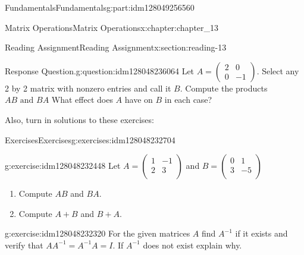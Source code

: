 \documentclass[oneside,10pt,]{book}
\numberwithin{equation}{section}
\begin{document}
\begin{partptx}{Fundamentals}{}{Fundamentals}{}{}{g:part:idm128049256560}
\begin{chapterptx}{Matrix Operations}{}{Matrix Operations}{}{}{x:chapter:chapter_13}
\begin{sectionptx}{Reading Assignment}{}{Reading Assignment}{}{}{x:section:reading-13}
\begin{question}{Response Question.}{g:question:idm128048236064}
Let \(A=\left(\begin{array}{cc} 2 & 0\\ 0 & -1 \end{array}\right)\). Select any 2 by 2 matrix with nonzero entries and call it \(B\). Compute the products \(AB \textrm{ and }BA\)  What effect does \(A\) have on \(B\) in each case?%
\end{question}
Also, turn in solutions to these exercises:%
%
%
\typeout{************************************************}
\typeout{************************************************}
%
\begin{exercises-subsection}{Exercises}{}{Exercises}{}{}{g:exercises:idm128048232704}
\par\medskip\noindent%
%
\begin{exercisegroup}
\begin{divisionexerciseeg}{1}{}{}{g:exercise:idm128048232448}%
Let \(A=\left(
\begin{array}{cc}
1 & -1 \\
2 & 3 \\
\end{array}
\right)\) and  \(B =\left(
\begin{array}{cc}
0 & 1 \\
3 & -5 \\
\end{array}
\right)\)%
\par
%
\begin{enumerate}[label=(\alph*)]
\item{}Compute \(A B\) and \(B A\).%
\item{}Compute \(A + B\) and \(B + A\).%
\end{enumerate}
%
\end{divisionexerciseeg}%
\begin{divisionexerciseeg}{2}{}{}{g:exercise:idm128048232320}%
For the given matrices \(A\) find \(A^{-1}\) if it exists and verify that \(A A^{-1}=A^{-1}A = I\). If \(A^{-1}\) does not exist explain why.%
\par
%
\end{divisionexerciseeg}
\end{exercisegroup}
\end{exercises-subsection}
\end{sectionptx}
\end{chapterptx}
\end{partptx}
\end{document}
